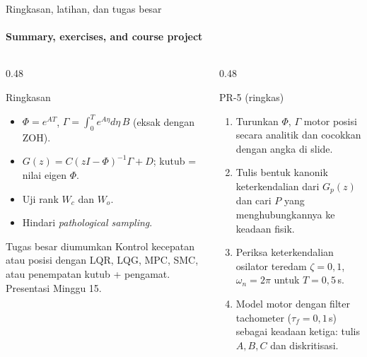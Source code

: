 \documentclass[aspectratio=169,10pt]{beamer}
\begin{document}
\begin{frame}{Ringkasan, latihan, dan tugas besar}
	\framesubtitle{Summary, exercises, and course project}
	\begin{columns}[T]
		\begin{column}{0.48\textwidth}
			\begin{block}{Ringkasan}
				\small
				\begin{itemize}
					\item $\Phi = e^{AT}$, $\Gamma = \int_0^Te^{A\eta}d\eta\,B$ (eksak dengan ZOH).
					\item $G(z) = C(zI-\Phi)^{-1}\Gamma + D$; kutub = nilai eigen $\Phi$.
					\item Uji rank $W_c$ dan $W_o$.
					\item Hindari \textit{pathological sampling}.
				\end{itemize}
			\end{block}
			\begin{exampleblock}{Tugas besar diumumkan}
				\small Kontrol kecepatan atau posisi dengan LQR, LQG, MPC, SMC, atau penempatan kutub + pengamat. Presentasi Minggu 15.
			\end{exampleblock}
		\end{column}
		\begin{column}{0.48\textwidth}
			\begin{exampleblock}{PR-5 (ringkas)}
				\small
				\begin{enumerate}
					\item Turunkan $\Phi$, $\Gamma$ motor posisi secara analitik dan cocokkan dengan angka di slide.
					\item Tulis bentuk kanonik keterkendalian dari $G_p(z)$ dan cari $P$ yang menghubungkannya ke keadaan fisik.
					\item Periksa keterkendalian osilator teredam $\zeta=0{,}1$, $\omega_n = 2\pi$ untuk $T=0{,}5$\,s.
					\item Model motor dengan filter tachometer ($\tau_f = 0{,}1$\,s) sebagai keadaan ketiga: tulis $A, B, C$ dan diskritisasi.
				\end{enumerate}
			\end{exampleblock}
		\end{column}
	\end{columns}
\end{frame}
\end{document}
